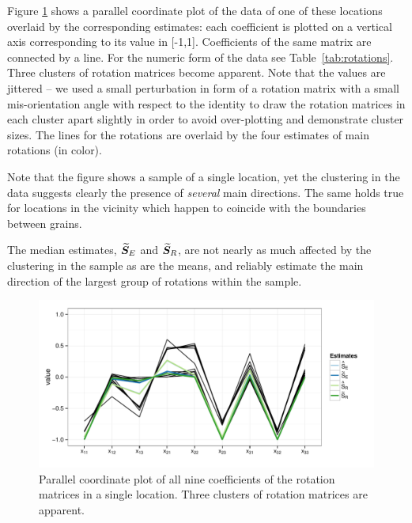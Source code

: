 Figure \ref{fig:pcp} shows a parallel coordinate plot of the data of one of these locations overlaid by the corresponding estimates: each coefficient is plotted on a vertical axis corresponding to its value in [-1,1]. Coefficients of the same matrix are connected by a line.  For the numeric form of the data see Table~\ref{tab:rotations}. Three clusters of rotation matrices become apparent. Note that the values are jittered -- we used a small perturbation in form of a rotation matrix with a small mis-orientation angle with respect to the identity to draw the rotation matrices in each cluster apart slightly in order to avoid over-plotting and demonstrate cluster sizes. The lines for the rotations are overlaid by the four estimates of main rotations (in color).

 Note that the figure shows a sample of a single location, yet the clustering in the data suggests clearly the presence of \emph{several} main directions. The same holds true for locations in the vicinity which happen to coincide with the boundaries between grains. 

The  median estimates, ${\widetilde{\bm S}_E}$  and ${\widetilde{\bm S}_R}$, are not nearly as much affected by the clustering in the sample as are the means, and reliably estimate the main direction of the largest group of rotations within the sample.


\begin{figure}[htbp] %
   \centering
   \includegraphics[width=.7\textwidth]{images/pcp.pdf} 
   \caption{ \label{fig:pcp}Parallel coordinate plot of all nine coefficients of the rotation matrices in a single location. Three clusters of rotation matrices are apparent.  }
\end{figure}



